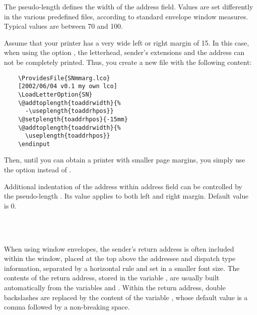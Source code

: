 \begin{Declaration}
\end{Declaration}
%
The pseudo-length  defines the width of the
address field. Values are set differently in the various predefined
 files, according to standard envelope window
measures. Typical values are between 70 and 100.
\begin{Example}
  Assume that your printer has a very wide left or right margin of
  15. In this case, when using the option , the
  letterhead, sender's extensions and the address can not be
  completely printed. Thus, you create a new  file with the
  following content:
  \begin{lstlisting}
    \ProvidesFile{SNmmarg.lco}
    [2002/06/04 v0.1 my own lco]
    \LoadLetterOption{SN}
    \@addtoplength{toaddrwidth}{%
      -\useplength{toaddrhpos}}
    \@setplength{toaddrhpos}{-15mm}
    \@addtoplength{toaddrwidth}{%
      \useplength{toaddrhpos}}
    \endinput
  \end{lstlisting}
  Then, until you can obtain a printer with smaller page margins, you
  simply use the option  instead of .
\end{Example}
%
%


\begin{Declaration}
\end{Declaration}
%
Additional indentation of the address within address field can be
controlled by the pseudo-length . Its value
applies to both left and right margin. Default value is 0.
%
%


\begin{Declaration}
  \\
  \\
\end{Declaration}
%
%
When using window envelopes, the sender's return address is often
included within the window, placed at the top above the addressee and
dispatch type information, separated by a horizontal rule and set in a
smaller font size. The contents of the return address, stored in the
variable , are usually built automatically from
the variables  and . Within
the return address, double backslashes are replaced by the content of
the variable , whose default value is a
comma followed by a non-breaking space. 

